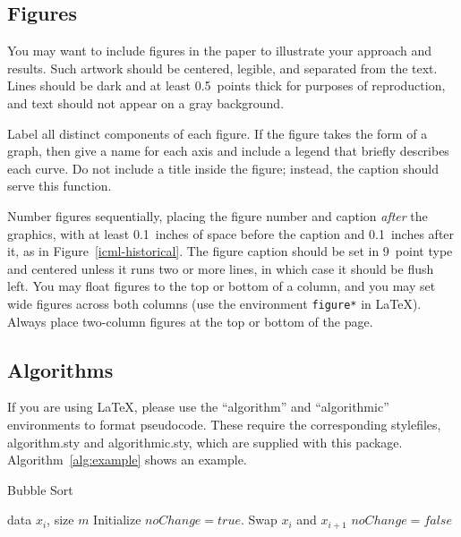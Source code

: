 \documentclass{article}
\begin{document}
\subsection{Figures}

You may want to include figures in the paper to illustrate
your approach and results. Such artwork should be centered,
legible, and separated from the text. Lines should be dark and at
least 0.5~points thick for purposes of reproduction, and text should
not appear on a gray background.

Label all distinct components of each figure. If the figure takes the
form of a graph, then give a name for each axis and include a legend
that briefly describes each curve. Do not include a title inside the
figure; instead, the caption should serve this function.

Number figures sequentially, placing the figure number and caption
\emph{after} the graphics, with at least 0.1~inches of space before
the caption and 0.1~inches after it, as in
Figure~\ref{icml-historical}. The figure caption should be set in
9~point type and centered unless it runs two or more lines, in which
case it should be flush left. You may float figures to the top or
bottom of a column, and you may set wide figures across both columns
(use the environment \texttt{figure*} in \LaTeX). Always place
two-column figures at the top or bottom of the page.

\subsection{Algorithms}

If you are using \LaTeX, please use the ``algorithm'' and ``algorithmic''
environments to format pseudocode. These require
the corresponding stylefiles, algorithm.sty and
algorithmic.sty, which are supplied with this package.
Algorithm~\ref{alg:example} shows an example.

\begin{algorithm}[tb]
   \caption{Bubble Sort}
   \label{alg:example}
\begin{algorithmic}
    data $x_i$, size $m$
   \REPEAT
   \STATE Initialize $noChange = true$.
   \STATE Swap $x_i$ and $x_{i+1}$
   \STATE $noChange = false$
   \ENDIF
   \ENDFOR
\end{algorithmic}
\end{algorithm}
\end{document}
